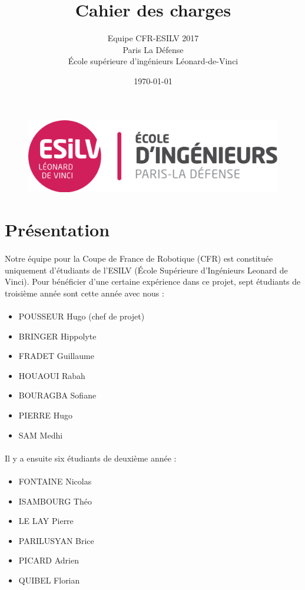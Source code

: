 \documentclass[12pt,a4paper]{article}
\title{Cahier des charges\\}
\author{Equipe CFR-ESILV 2017\\ [2em]
Paris La Défense\\[2em]
École supérieure d'ingénieurs Léonard-de-Vinci\\[1em]}
\date\today
\begin{document}
\maketitle

\begin{figure}[!h]
\centering
\includegraphics[width=5 cm]{img/Logo_ESILV.jpeg}
\end{figure}

\section{Présentation}

\paragraph{}
Notre équipe pour la Coupe de France de Robotique (CFR) est constituée uniquement d'étudiants de 
l'ESILV (École Supérieure d'Ingénieurs Leonard de Vinci).
Pour bénéficier d'une certaine expérience dans ce projet, sept étudiants de troisième année sont cette année avec nous : 
\paragraph{}
\begin{itemize}
\item POUSSEUR Hugo (chef de projet) 
\item BRINGER Hippolyte
\item FRADET Guillaume
\item HOUAOUI Rabah
\item BOURAGBA Sofiane
\item PIERRE Hugo
\item SAM Medhi 
\end{itemize}



\paragraph{}
Il y a ensuite six étudiants de deuxième année :  

\paragraph{}
\begin{itemize}
\item FONTAINE Nicolas 
\item ISAMBOURG Théo
\item LE LAY Pierre
\item PARILUSYAN Brice
\item PICARD Adrien
\item QUIBEL Florian
\end{itemize}
\end{document}
